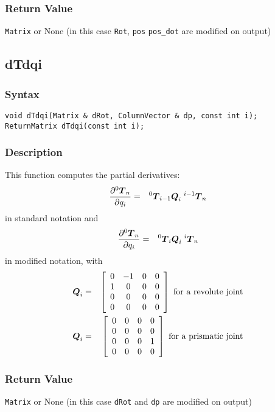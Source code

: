 \documentclass[11pt,fleqn,letterpaper]{report}
\newcommand{\mbold}[1]{\mbox{\boldmath $ #1 $}}
\newcommand{\matr}[2]{\left[\begin{array}{#1} #2 \end{array}\right]}
\newcommand{\dfdx}[2]{\frac{\partial #1}{\partial #2}}
\begin{document}
\subsubsection*{Return Value}
{\tt Matrix} or None (in this case {\tt Rot}, {\tt pos} {\tt pos\_dot} are modified on output)
\newpage 

\subsection*{dTdqi}
\subsubsection*{Syntax}
\begin{verbatim}
void dTdqi(Matrix & dRot, ColumnVector & dp, const int i);
ReturnMatrix dTdqi(const int i);
\end{verbatim}
\subsubsection*{Description}
This function computes the partial derivatives:
\begin{eqnarray}
\dfdx{{}^0 \mbold{T}_n}{q_i} & = & {}^0 \mbold{T}_{i-1} \mbold{Q}_i \; {}^{i-1} \mbold{T}_n
\end{eqnarray}
in standard notation and
\begin{eqnarray}
  \dfdx{{}^0 \mbold{T}_n}{q_i} 
  & = & {}^0 \mbold{T}_{i} \mbold{Q}_i \; {}^{i} \mbold{T}_n
\end{eqnarray}
in modified notation, with
\begin{eqnarray}
\mbold{Q}_i & = & \matr{cccc}{
0 & -1 & 0 & 0 \\
1 & 0 & 0 & 0 \\
0 & 0 & 0 & 0 \\
0 & 0 & 0 & 0} \mbox{ for a revolute joint} \\
\mbold{Q}_i & = & \matr{cccc}{
0 & 0 & 0 & 0 \\
0 & 0 & 0 & 0 \\
0 & 0 & 0 & 1 \\
0 & 0 & 0 & 0} \mbox{ for a prismatic joint} 
\end{eqnarray}


\subsubsection*{Return Value}

{\tt Matrix} or None (in this case {\tt dRot} and {\tt dp} are modified on output)
\end{document}
